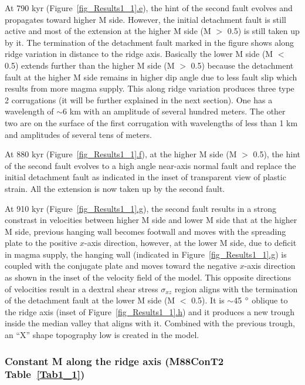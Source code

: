 At 790 kyr (Figure~\hyperref[fig_Results1_1]{\ref{fig_Results1_1}.e}), the hint of the second fault evolves and propagates toward higher M side. However, the initial detachment fault is still active and most of the extension at the higher M side (M $>$ 0.5) is still taken up by it. The termination of the detachment fault marked in the figure shows along ridge variation in distance to the ridge axis. Basically the lower M side (M $<$ 0.5) extends further than the higher M side (M $>$ 0.5) because the detachment fault at the higher M side remains in higher dip angle due to less fault slip which results from more magma supply. This along ridge variation produces three type 2 corrugations (it will be further explained in the next section). One has a wavelength of $\sim$6 km with an amplitude of several hundred meters. The other two are on the surface of the first corrugation with wavelengths of less than 1 km and amplitudes of several tens of meters.   

At 880 kyr (Figure~\hyperref[fig_Results1_1]{\ref{fig_Results1_1}.f}), at the higher M side (M $>$ 0.5), the hint of the second fault evolves to a high angle near-axis normal fault and replace the initial detachment fault as indicated in the inset of transparent view of plastic strain. All the extension is now taken up by the second fault.

At 910 kyr (Figure~\hyperref[fig_Results1_1]{\ref{fig_Results1_1}.g}), the second fault results in a strong constrast in velocities between higher M side and lower M side that at the higher M side, previous hanging wall becomes footwall and moves with the spreading plate to the positive $x$-axis direction, however, at the lower M side, due to deficit in magma supply, the hanging wall (indicated in Figure~\hyperref[fig_Results1_1]{\ref{fig_Results1_1}.g}) is coupled with the conjugate plate and moves toward the negative $x$-axis direction as shown in the inset of the velocity field of the model. This opposite directions of velocities result in a dextral shear stress $\sigma_{xz}$ region aligns with the termination of the detachment fault at the lower M side (M $<$ 0.5). It is $\sim$45 $\degree$ oblique to the ridge axis (inset of Figure~\hyperref[fig_Results1_1]{\ref{fig_Results1_1}.h}) and it produces a new trough inside the median valley that aligns with it. Combined with the previous trough, an ``X'' shape topography low is created in the model.

\subsubsection{Constant M along the ridge axis (M88ConT2 Table~\hyperref[Tab1_1]{\ref{Tab1_1}})}

